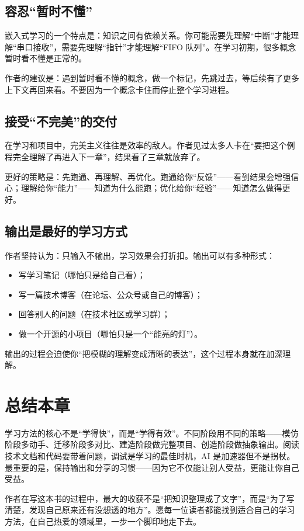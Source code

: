 \subsection{容忍“暂时不懂”}

嵌入式学习的一个特点是：知识之间有依赖关系。你可能需要先理解“中断”才能理解“串口接收”，需要先理解“指针”才能理解“FIFO 队列”。在学习初期，很多概念暂时看不懂是正常的。

作者的建议是：遇到暂时看不懂的概念，做一个标记，先跳过去，等后续有了更多上下文再回来看。不要因为一个概念卡住而停止整个学习进程。

\subsection{接受“不完美”的交付}

在学习和项目中，完美主义往往是效率的敌人。作者见过太多人卡在“要把这个例程完全理解了再进入下一章”，结果看了三章就放弃了。

更好的策略是：先跑通、再理解、再优化。跑通给你“反馈”——看到结果会增强信心；理解给你“能力”——知道为什么能跑；优化给你“经验”——知道怎么做得更好。

\subsection{输出是最好的学习方式}

作者坚持认为：只输入不输出，学习效果会打折扣。输出可以有多种形式：

\begin{itemize}
	\item 写学习笔记（哪怕只是给自己看）；
	\item 写一篇技术博客（在论坛、公众号或自己的博客）；
	\item 回答别人的问题（在技术社区或学习群）；
	\item 做一个开源的小项目（哪怕只是一个“能亮的灯”）。
\end{itemize}

输出的过程会迫使你“把模糊的理解变成清晰的表达”，这个过程本身就在加深理解。

\section{总结本章}

学习方法的核心不是“学得快”，而是“学得有效”。不同阶段用不同的策略——模仿阶段多动手、迁移阶段多对比、建造阶段做完整项目、创造阶段做抽象输出。阅读技术文档和代码要带着问题，调试是学习的最佳时机，AI 是加速器但不是拐杖。最重要的是，保持输出和分享的习惯——因为它不仅能让别人受益，更能让你自己受益。

作者在写这本书的过程中，最大的收获不是“把知识整理成了文字”，而是“为了写清楚，发现自己原来还有没想透的地方”。愿每一位读者都能找到适合自己的学习方法，在自己热爱的领域里，一步一个脚印地走下去。
